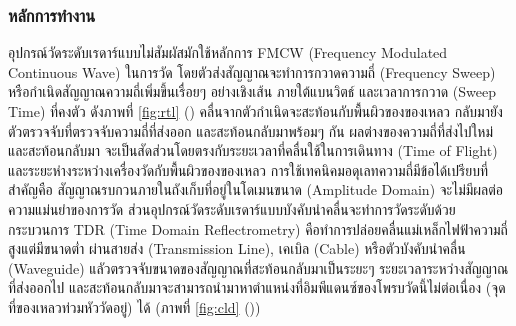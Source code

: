 \documentclass[final,11pt,a4paper]{article}
\begin{document}
\subsubsection{หลักการทำงาน} 
อุปกรณ์วัดระดับเรดาร์แบบไม่สัมผัสมักใช้หลักการ FMCW (Frequency Modulated Continuous Wave) ในการวัด 
โดยตัวส่งสัญญาณจะทำการกวาดความถี่ (Frequency Sweep) หรือกำเนิดสัญญาณความถี่เพิ่มขึ้นเรื่อยๆ อย่างเชิงเส้น ภายใต้แบนวิตธ์ และเวลาการกวาด
(Sweep Time) ที่คงตัว ดังภาพที่ \ref{fig:rtl} () คลื่นจากตัวกำเนิดจะสะท้อนกับพื้นผิวของของเหลว กลับมายังตัวตรวจจับที่ตรวจจับความถี่ที่ส่งออก และสะท้อนกลับมาพร้อมๆ กัน
ผลต่างของความถี่ที่ส่งไปใหม่ และสะท้อนกลับมา จะเป็นสัดส่วนโดยตรงกับระยะเวลาที่คลื่นใช้ในการเดินทาง (Time of Flight) 
และระยะห่างระหว่างเครื่องวัดกับพื้นผิวของของเหลว การใช้เทคนิคมอดุเลทความถี่มีข้อได้เปรียบที่สำคัญคือ สัญญาณรบกวนภายในถังเก็บที่อยู่ในโดเมนขนาด 
(Amplitude Domain) จะไม่มีผลต่อความแม่นยำของการวัด ส่วนอุปกรณ์วัดระดับเรดาร์แบบบังคับนำคลื่นจะทำการวัดระดับด้วยกระบวนการ TDR 
(Time Domain Reflectrometry) คือทำการปล่อยคลื่นแม่เหล็กไฟฟ้าความถี่สูงแต่มีขนาดต่ำ ผ่านสายส่ง (Transmission Line), เคเบิล (Cable) 
หรือตัวบังคับนำคลื่น (Waveguide) แลัวตรวจจับขนาดของสัญญาณที่สะท้อนกลับมาเป็นระยะๆ ระยะเวลาระหว่างสัญญาณที่ส่งออกไป 
และสะท้อนกลับมาจะสามารถนำมาหาตำแหน่งที่อิมพีแดนซ์ของโพรบวัดนี้ไม่ต่อเนื่อง (จุดที่ของเหลวท่วมหัววัดอยู่) ได้ (ภาพที่ \ref{fig:cld} ())
\end{document}
